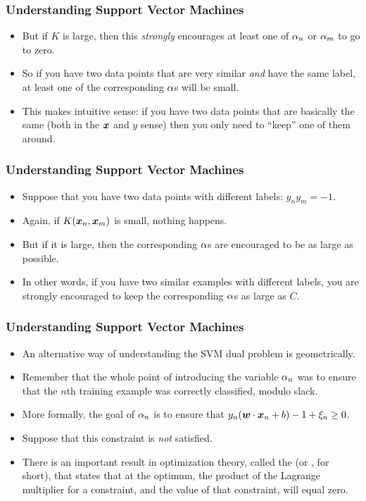 \documentclass[trans]{beamer}
\begin{document}
\begin{frame}
  \frametitle{Understanding Support Vector Machines}
\begin{itemize}
\item  But if $K$ is large, then this \emph{strongly} encourages at
least one of $\alpha_n$ or $\alpha_m$ to go to zero.  
\item So if you have two
data points that are very similar \emph{and} have the same label, at
least one of the corresponding $\alpha$s will be small. 
\item This makes
intuitive sense: if you have two data points that are basically the
same (both in the ${\boldsymbol{x}}$ and $y$ sense) then you only need to ``keep''
one of them around.
\end{itemize}
\end{frame}

\begin{frame}
  \frametitle{Understanding Support Vector Machines}
\begin{itemize}
\item 
Suppose that you have two data points with different labels: $y_n y_m
= -1$.
\item  Again, if $K({\boldsymbol{x}}_n,{\boldsymbol{x}}_m)$ is small, nothing happens.  
\item But if
it is large, then the corresponding $\alpha$s are encouraged to be as
large as possible. 
\item In other words, if you have two similar examples
with different labels, you are strongly encouraged to keep the
corresponding $\alpha$s as large as $C$.
\end{itemize}
\end{frame}

\begin{frame}
  \frametitle{Understanding Support Vector Machines}
\begin{itemize}
\item 
An alternative way of understanding the SVM dual problem is
geometrically.
\item  Remember that the whole point of introducing the
variable $\alpha_n$ was to ensure that the $n$th training example was
correctly classified, modulo slack. 
\item More formally, the goal of
$\alpha_n$ is to ensure that $y_n ({\boldsymbol{w}} \cdot {\boldsymbol{x}}_n+b) - 1 + \xi_n \geq 0$.
\item Suppose that this constraint is \emph{not} satisfied. 
\item There is an
important result in optimization theory, called the
 (or ,
for short), that states that at the optimum, the product of the
Lagrange multiplier for a constraint, and the value of that
constraint, will equal zero. 
\end{itemize}
\end{frame}
\end{document}

